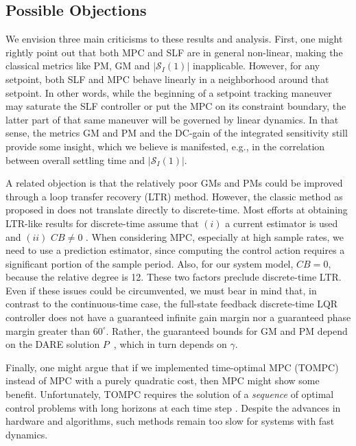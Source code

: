 \documentclass[twocolumn,twoside]{IEEEtran}
\begin{document}
\subsection{Possible Objections}
We envision three main criticisms to these results and analysis. First, one might rightly point out that both MPC and SLF are in general non-linear, making the classical metrics like PM, GM and $|\mathcal{S}_I(1)|$ inapplicable. However, for any setpoint, both SLF and MPC behave linearly in a neighborhood around that setpoint. In other words, while the beginning of a setpoint tracking maneuver may saturate the SLF controller or put the MPC on its constraint boundary, the latter part of that same maneuver will be governed by linear dynamics. In that sense, the metrics GM and PM and the DC-gain of the integrated sensitivity still provide some insight, which we believe is manifested, e.g., in the correlation between overall settling time and $|\mathcal{S}_I(1)|$.

A related objection is that the relatively poor GMs and PMs could be improved through a loop transfer recovery (LTR) method. However, the classic method as proposed in \cite{doyle_robustness_1979} does not translate directly to discrete-time. Most efforts at obtaining LTR-like results for discrete-time assume that $(i)$ a current estimator is used and $(ii)$ $CB\neq 0$ \cite{Maciejowski_asymptotic_1985,guaracy_discrete_2015,ishihara_loop_1986}. When considering MPC, especially at high sample rates, we need to use a prediction estimator, since computing the control action requires a significant portion of the sample period. Also, for our system model, $CB=0$, because the relative degree is 12. These two factors preclude discrete-time LTR. Even if these issues could be circumvented, we must bear in mind that, in contrast to the continuous-time case, the full-state feedback discrete-time LQR controller does not have a guaranteed infinite gain margin nor a guaranteed phase margin greater than $60^{\circ}$. Rather, the guaranteed bounds for GM and PM depend on the DARE solution $P$~\cite[p. 136]{andersson_moore}, which in turn depends on $\gamma$. 

Finally, one might argue that if we implemented time-optimal MPC (TOMPC) \cite{broeck_time_2009} instead of MPC with a purely quadratic cost, then MPC might show some benefit. Unfortunately, TOMPC requires the solution of a \emph{sequence} of optimal control problems with long horizons at each time step \cite{broeck_time_2009}. Despite the advances in hardware and algorithms, such methods remain too slow for systems with fast dynamics. 
\end{document}
